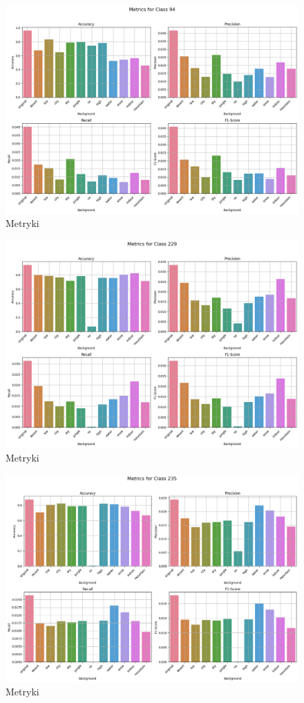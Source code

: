 \begin{figure}
	\centering\includegraphics[width=.9\textwidth]{img/94}
	\caption{Metryki}
	\label{rys:94}
\end{figure}

\begin{figure}
	\centering\includegraphics[width=.9\textwidth]{img/229}
	\caption{Metryki}
	\label{rys:229}
\end{figure}

\begin{figure}
	\centering\includegraphics[width=.9\textwidth]{img/235}
	\caption{Metryki}
	\label{rys:235}
\end{figure}

